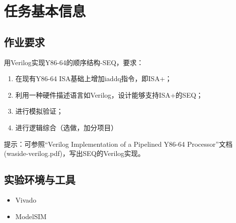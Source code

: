 \section{任务基本信息}

\subsection{作业要求}
用Verilog实现Y86-64的顺序结构-SEQ，要求：

\begin{enumerate}
    \item 在现有Y86-64 ISA基础上增加iaddq指令，即ISA+；
    \item 利用一种硬件描述语言如Verilog，设计能够支持ISA+的SEQ；
    \item 进行模拟验证；
    \item 进行逻辑综合（选做，加分项目）
\end{enumerate}

提示：可参照“Verilog Implementation of a Pipelined Y86-64 Processor”文档(waside-verilog.pdf)，写出SEQ的Verilog实现。 

\subsection{实验环境与工具}

\begin{itemize}
    \item Vivado
    \item ModelSIM
\end{itemize}
